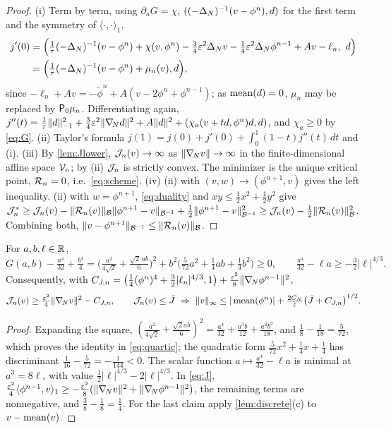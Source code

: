 \begin{proof}
(i) Term by term, using $\partial_a G=\chi$, $((-\Delta_N)^{-1}(v-\phi^n),d)$ for the first term and the symmetry of $\langle\cdot,\cdot\rangle_1$,
\begin{align*}
j'(0)&=\Big(\tfrac1\tau(-\Delta_N)^{-1}(v-\phi^n)+\chi(v,\phi^n)-\tfrac34\varepsilon^2\Delta_N v-\tfrac14\varepsilon^2\Delta_N\phi^{n-1}+Av-\ell_n,\ d\Big)\\
&=\Big(\tfrac1\tau(-\Delta_N)^{-1}(v-\phi^n)+\mu_n(v),d\Big),
\end{align*}
since $-\ell_n+Av=-\tilde\phi^n+A(v-2\phi^n+\phi^{n-1})$; as $\operatorname{mean}(d)=0$, $\mu_n$ may be replaced by $\mathsf{P}_0\mu_n$. Differentiating again, $j''(t)=\frac1\tau\lVert d\rVert_{-1}^2+\frac34\varepsilon^2\lVert \nabla_{\!N} d\rVert^2+A\lVert d\rVert^2+(\chi_a(v+td,\phi^n)d,d)$, and $\chi_a\ge0$ by \eqref{eq:G}.
(ii) Taylor's formula $j(1)=j(0)+j'(0)+\int_0^1(1-t)j''(t)\,dt$ and (i).
(iii) By \cref{lem:Jlower}, $\mathcal{J}_n(v)\to\infty$ as $\lVert \nabla_{\!N} v\rVert\to\infty$ in the finite-dimensional affine space $\mathcal{V}_n$; by (ii) $\mathcal{J}_n$ is strictly convex. The minimizer is the unique critical point, $\mathcal{R}_n=0$, i.e.\ \eqref{eq:scheme}.
(iv) (ii) with $(v,w)\to(\phi^{n+1},v)$ gives the left inequality. (ii) with $w=\phi^{n+1}$, \eqref{eq:duality} and $xy\le\frac12x^2+\frac12y^2$ give $\mathcal{J}_n^*\ge\mathcal{J}_n(v)-\lVert \mathcal{R}_n(v)\rVert_{\mathcal{B}}\lVert \phi^{n+1}-v\rVert_{\mathcal{B}^{-1}}+\frac12\lVert \phi^{n+1}-v\rVert_{\mathcal{B}^{-1}}^2\ge\mathcal{J}_n(v)-\frac12\lVert \mathcal{R}_n(v)\rVert_{\mathcal{B}}^2$. Combining both, $\lVert v-\phi^{n+1}\rVert_{\mathcal{B}^{-1}}\le\lVert \mathcal{R}_n(v)\rVert_{\mathcal{B}}$.
\end{proof}

\begin{lemma}\label{lem:Jlower}
For $a,b,\ell\in\mathbb{R}$,
\begin{equation}\label{eq:quartic}
G(a,b)-\tfrac{a^4}{32}+\tfrac{b^4}{4}=\Big(\tfrac{a^2}{4\sqrt2}+\tfrac{\sqrt2\,ab}{6}\Big)^2+b^2\Big(\tfrac5{72}a^2+\tfrac14ab+\tfrac14b^2\Big)\ge0,\qquad \tfrac{a^4}{32}-\ell a\ge-\tfrac32|\ell|^{4/3}.
\end{equation}
Consequently, with $C_{J,n}=\big(\frac14(\phi^n)^4+\frac32|\ell_n|^{4/3},1\big)+\frac{\varepsilon^2}{8}\lVert \nabla_{\!N}\phi^{n-1}\rVert^2$,
\begin{equation}\label{eq:sublevel-linf}
\mathcal{J}_n(v)\ge\tfrac{\varepsilon^2}{4}\lVert \nabla_{\!N} v\rVert^2-C_{J,n},\qquad \mathcal{J}_n(v)\le\bar J\ \Rightarrow\ \lVert v\rVert_\infty\le|\operatorname{mean}(\phi^n)|+\tfrac{2C_N}{\varepsilon}\big(\bar J+C_{J,n}\big)^{1/2}.
\end{equation}
\end{lemma}

\begin{proof}
Expanding the square, $(\frac{a^2}{4\sqrt2}+\frac{\sqrt2ab}{6})^2=\frac{a^4}{32}+\frac{a^3b}{12}+\frac{a^2b^2}{18}$, and $\frac18-\frac1{18}=\frac5{72}$, which proves the identity in \eqref{eq:quartic}; the quadratic form $\frac5{72}x^2+\frac14x+\frac14$ has discriminant $\frac1{16}-\frac5{72}=-\frac1{144}<0$. The scalar function $a\mapsto\frac{a^4}{32}-\ell a$ is minimal at $a^3=8\ell$, with value $\frac12|\ell|^{4/3}-2|\ell|^{4/3}$. In \eqref{eq:J}, $\frac{\varepsilon^2}4\langle\phi^{n-1},v\rangle_1\ge-\frac{\varepsilon^2}8(\lVert \nabla_{\!N} v\rVert^2+\lVert \nabla_{\!N}\phi^{n-1}\rVert^2)$, the remaining terms are nonnegative, and $\frac38-\frac18=\frac14$. For the last claim apply \cref{lem:discrete}(c) to $v-\operatorname{mean}(v)$.
\end{proof}

